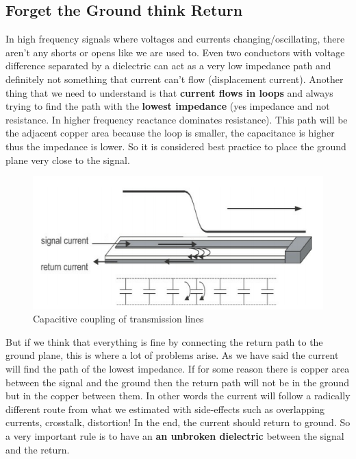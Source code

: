 \documentclass[final]{cubedoc}
\begin{document}
	\subsection{Forget the Ground think Return}
	
	In high frequency signals where voltages and currents changing/oscillating, there aren't any shorts or opens like we are used to. Even two conductors with voltage difference separated by a dielectric can act as a very low impedance path and definitely not something that current can't flow (displacement current). Another thing that we need to understand is that \textbf{current flows in loops} and always trying to find the path with the \textbf{lowest impedance} (yes impedance and not resistance. In higher frequency reactance dominates resistance).
	This path will be the adjacent copper area because the loop is smaller, the capacitance is higher thus the impedance is lower. So it is considered best practice to place the ground plane very close to the signal.
	
	\begin{figure}[h!]
		\centering
		\includegraphics[keepaspectratio, width=\textwidth, height=.2\textheight]{assets/signal_return.png}
		\caption{Capacitive coupling of transmission lines \cite{bogatin2009signal}}
	\end{figure}
	
	But if we think that everything is fine by connecting the return path to the ground plane, this is where a lot of problems arise. As we have said the current will find the path of the lowest impedance. If for some reason there is copper area between the signal and the ground then the return path will not be in the ground but in the copper between them. In other words the current will follow a radically different route from what we estimated with side-effects such as overlapping currents, crosstalk, distortion! In the end, the current should return to ground. So a very important rule is to have an \textbf{an unbroken dielectric} between the signal and the return. 
	
\end{document}
